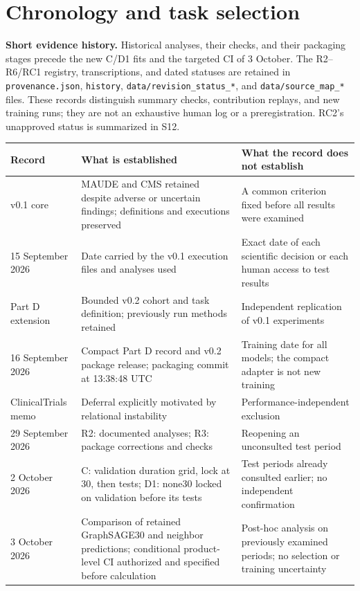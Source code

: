 \documentclass[10pt,a4paper]{article}
\newcommand{\src}[1]{{\small\nolinkurl{#1}}}
\begin{document}
\section{Chronology and task selection}
\label{supp:chronology}
\textbf{Short evidence history.} Historical analyses, their checks, and their packaging stages precede the new C/D1 fits and the targeted CI of 3 October. The R2--R6/RC1 registry, transcriptions, and dated statuses are retained in \src{provenance.json}, \src{history}, \src{data/revision_status_*}, and \src{data/source_map_*} files. These records distinguish summary checks, contribution replays, and new training runs; they are not an exhaustive human log or a preregistration. RC2's unapproved status is summarized in S12.
\begin{tabularx}{\linewidth}{@{}p{30mm}Xp{39mm}@{}}
\toprule
Record & What is established & What the record does not establish\\
\midrule
v0.1 core & MAUDE and CMS retained despite adverse or uncertain findings; definitions and executions preserved & A common criterion fixed before all results were examined\\
15 September 2026 & Date carried by the v0.1 execution files and analyses used & Exact date of each scientific decision or each human access to test results\\
Part D extension & Bounded v0.2 cohort and task definition; previously run methods retained & Independent replication of v0.1 experiments\\
16 September 2026 & Compact Part D record and v0.2 package release; packaging commit at 13:38:48 UTC & Training date for all models; the compact adapter is not new training\\
ClinicalTrials memo & Deferral explicitly motivated by relational instability & Performance-independent exclusion\\
29 September 2026 & R2: documented analyses; R3: package corrections and checks & Reopening an unconsulted test period\\
2 October 2026 & C: validation duration grid, lock at 30, then tests; D1: none30 locked on validation before its tests & Test periods already consulted earlier; no independent confirmation\\
3 October 2026 & Comparison of retained GraphSAGE30 and neighbor predictions; conditional product-level CI authorized and specified before calculation & Post-hoc analysis on previously examined periods; no selection or training uncertainty\\
\bottomrule
\end{tabularx}
\end{document}
